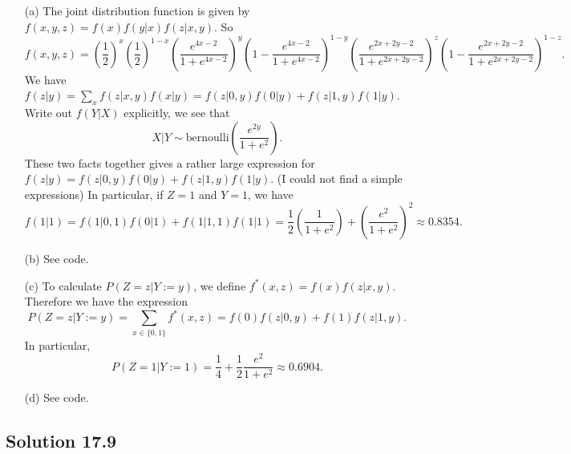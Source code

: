 \begin{itemize}
    \item[(a)] The joint distribution function is given by $f(x, y, z) = f(x) f(y|x) f(z|x, y)$.
        So
        \begin{equation*}
            f(x,y,z) = \left(\frac{1}{2}\right)^x \left(\frac{1}{2}\right)^{1 - x}
                \left(\frac{e^{4x-2}}{1 + e^{4x-2}}\right)^y \left(1 - \frac{e^{4x-2}}{1 + e^{4x-2}}\right)^{1-y}
                \left(\frac{e^{2x + 2y - 2}}{1 + e^{2x + 2y - 2}}\right)^z \left(1 - \frac{e^{2x + 2y - 2}}{1 + e^{2x + 2y - 2}}\right)^{1-z}.
        \end{equation*}
        We have $f(z|y) = \sum_{x} f(z|x,y)f(x|y) = f(z|0,y)f(0|y) + f(z|1,y)f(1|y)$.
        Write out $f(Y|X)$ explicitly, we see that
        \begin{equation*}
            X|Y \sim \mathrm{bernoulli}\left(\frac{e^{2y}}{1 + e^2}\right).
        \end{equation*}
        These two facts together gives a rather large expression for $f(z|y) = f(z|0,y)f(0|y) + f(z|1,y)f(1|y)$. (I could not find a simple expressions)
        In particular, if $Z = 1$ and $Y = 1$, we have
        \begin{equation*}
            f(1|1) = f(1|0,1)f(0|1) + f(1|1,1)f(1|1)
                = \frac{1}{2}\left(\frac{1}{1 + e^2}\right) + \left(\frac{e^2}{1 + e^2}\right)^2
                \approx 0.8354.
        \end{equation*}
    \item[(b)] See code.
    \item[(c)] To calculate $P(Z=z|Y:=y)$, we define $f^*(x, z) = f(x)f(z|x,y)$.
        Therefore we have the expression
        \begin{equation*}
            P(Z=z|Y:=y) = \sum_{x \in \{0, 1\}} f^*(x, z)
                = f(0) f(z|0,y) + f(1) f(z|1,y).
        \end{equation*}
        In particular,
        \begin{equation*}
            P(Z=1|Y:=1) = \frac{1}{4} + \frac{1}{2} \frac{e^2}{1 + e^2}
                \approx 0.6904.
        \end{equation*}
    \item[(d)] See code.
\end{itemize}


\subsection*{Solution 17.9}

